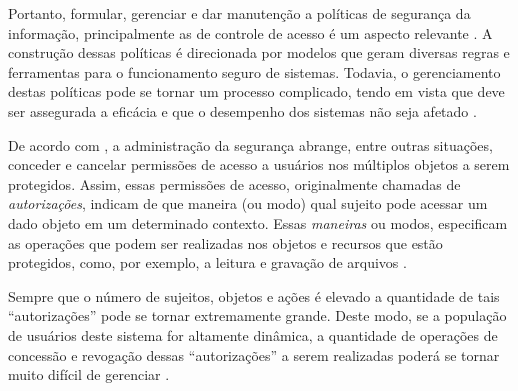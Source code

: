 \documentclass[
	12pt,				%
	openright,			%
	oneside,			%
	a4paper,			%
	english,			%
	french,				%
	spanish,			%
	brazil				%
	]{abntex2}
\begin{document}

Portanto, formular, gerenciar e dar manutenção a políticas de segurança da informação, principalmente as de controle de acesso é um aspecto relevante \cite{li_security_2006}. A construção dessas políticas é direcionada por modelos que geram diversas regras e ferramentas para o funcionamento seguro de sistemas. Todavia, o gerenciamento destas políticas pode se tornar um processo complicado, tendo em vista que deve ser assegurada a eficácia e que o desempenho dos sistemas não seja afetado \cite{ueda_tese_2012}.

De acordo com , a administração da segurança abrange, entre outras situações, conceder e cancelar permissões de acesso a usuários nos múltiplos objetos a serem protegidos. Assim, essas permissões de acesso, originalmente chamadas de \textit{autorizações}, indicam de que maneira (ou modo) qual sujeito pode acessar um dado objeto em um determinado contexto. Essas \textit{maneiras} ou modos, especificam as operações que podem ser realizadas nos objetos e recursos que estão protegidos, como, por exemplo, a leitura e gravação de arquivos \cite[p. 21]{bellettini_role_2001}.
	
Sempre que o número de sujeitos, objetos e ações é elevado a quantidade de tais ``autorizações'' pode se tornar extremamente grande. Deste modo, se a população de usuários deste sistema for altamente dinâmica, a quantidade de operações de concessão e revogação dessas ``autorizações'' a serem realizadas poderá se tornar muito difícil de gerenciar \cite[p. 21]{bellettini_role_2001}.
\end{document}
